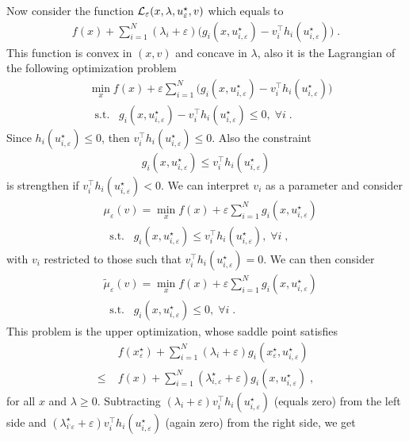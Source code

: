 \documentclass[journal,twoside,web]{ieeecolor}
\begin{document}
Now consider the function ${\cal L}_\varepsilon(x,\lambda,u_\varepsilon^\star,v)$ which equals to
\begin{align*}
f(x)+\sum_{i=1}^N (\lambda_i+\varepsilon) \big(g_i(x,u_{i,\varepsilon}^\star)-v_i^\top h_i(u_{i,\varepsilon}^\star)\big)\;.
\end{align*}
This function is convex in $(x,v)$ and concave in $\lambda$, also it is the Lagrangian of the following optimization problem
\begin{align*}
&\min_{x}f(x)+\varepsilon \sum_{i=1}^N \big(g_i(x,u_{i,\varepsilon}^\star)-v_i^\top h_i(u_{i,\varepsilon}^\star)\big)\\
&\;\;\text{s.t.}\;\;\;g_i(x,u_{i,\varepsilon}^\star)-v_i^\top h_i(u_{i,\varepsilon}^\star)\leq 0,\;\forall i\;.
\end{align*}
Since $h_i(u_{i,\varepsilon}^\star)\leq 0$, then $v_i^\top h_i(u_{i,\varepsilon}^\star)\leq 0$. Also the constraint 
\begin{align*}
g_i(x,u_{i,\varepsilon}^\star)\leq v_i^\top h_i(u_{i,\varepsilon}^\star)
\end{align*}
is strengthen if $v_i^\top h_i(u_{i,\varepsilon}^\star)<0$. 
We can interpret $v_i$ as a parameter and consider
\begin{align*}
&\mu_\varepsilon(v)=\min_{x}f(x)+\varepsilon \sum_{i=1}^N g_i(x,u_{i,\varepsilon}^\star)\\
&\;\;\text{s.t.}\;\;\;g_i(x,u_{i,\varepsilon}^\star)\leq v_i^\top h_i(u_{i,\varepsilon}^\star),\; \forall i\;,
\end{align*}
with $v_i$ restricted to those such that $v_i^\top h_i(u_{i,\varepsilon}^\star)=0$. We can then consider  
\begin{align*}
&\tilde{\mu}_\varepsilon(v)=\min_{x}f(x)+\varepsilon \sum_{i=1}^N g_i(x,u_{i,\varepsilon}^\star)\\
&\;\;\text{s.t.}\;\;\; g_i(x,u_{i,\varepsilon}^\star)\leq 0,\; \forall i \;.
\end{align*}
This problem is the upper optimization, whose saddle point satisfies
\begin{align*}
&f(x_\varepsilon^\star)+\sum_{i=1}^N (\lambda_i+\varepsilon) g_i(x_\varepsilon^\star,u_{i,\varepsilon}^\star)\\
\leq \; &f(x)+\sum_{i=1}^N (\lambda_{i,\varepsilon}^\star+\varepsilon) g_i(x,u_{i,\varepsilon}^\star)\;,
\end{align*}
for all $x$ and $\lambda \geq 0$\;. Subtracting $(\lambda_i+\varepsilon) v_i^\top h_i(u_{i,\varepsilon}^\star)$ (equals zero) from the left side and $(\lambda_{i^,\varepsilon}^\star+\varepsilon) v_i^\top  h_i(u_{i,\varepsilon}^\star)$ (again zero) from the right side, we get
\end{document}

